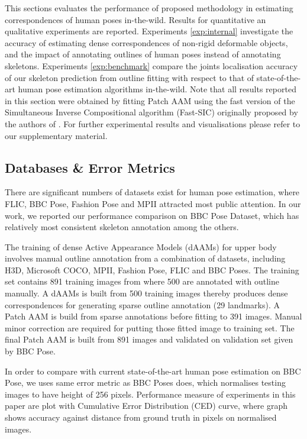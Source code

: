 This sections evaluates the performance of proposed methodology in estimating correspondences of human poses in-the-wild. Results for quantitative an qualitative experiments are reported. Experiments \ref{exp:internal} investigate the accuracy of estimating dense correspondences of non-rigid deformable objects, and the impact of annotating outlines of human poses instead of annotating skeletons. Experiments \ref{exp:benchmark} compare the joints localisation accuracy of our skeleton prediction from outline fitting with respect to that of state-of-the-art human pose estimation algorithms in-the-wild. Note that all results reported in this section were obtained by fitting Patch AAM using the fast version of the Simultaneous Inverse Compositional algorithm (Fast-SIC) originally proposed by the authors of \cite{Papandreou2008}. For further experimental results and visualisations please refer to our supplementary material.

\subsection{Databases \& Error Metrics}
There are significant numbers of datasets exist for human pose estimation, where FLIC\cite{sapp2013modec}, BBC Pose\cite{pfister2015flowing}, Fashion Pose\cite{dantone2013human} and MPII\cite{andriluka14cvpr} attracted most public attention. In our work, we reported our performance comparison on BBC Pose Dataset\cite{pfister2015flowing}, which has relatively most consistent skeleton annotation among the others. 

The training of dense Active Appearance Models (dAAMs) for upper body involves manual outline annotation from a combination of datasets, including H3D\cite{PoseletsICCV09}, Microsoft COCO\cite{lin2014microsoft}, MPII\cite{andriluka14cvpr}, Fashion Pose\cite{dantone2013human}, FLIC\cite{sapp2013modec} and BBC Poses\cite{pfister2015flowing}. The training set contains 891 training images from where 500 are annotated with outline manually. A dAAMs is built from 500 training images thereby produces dense correspondences for generating sparse outline annotation (29 landmarks). A Patch AAM is build from sparse annotations before fitting to 391 images. Manual minor correction are required for putting those fitted image to training set. The final Patch AAM is built from 891 images and validated on validation set given by BBC Pose.

In order to compare with current state-of-the-art human pose estimation on BBC Pose, we uses same error metric as BBC Poses does, which normalises testing images to have height of 256 pixels. Performance measure of experiments in this paper are plot with Cumulative Error Distribution (CED) curve, where graph shows accuracy against distance from ground truth in pixels on normalised images.

